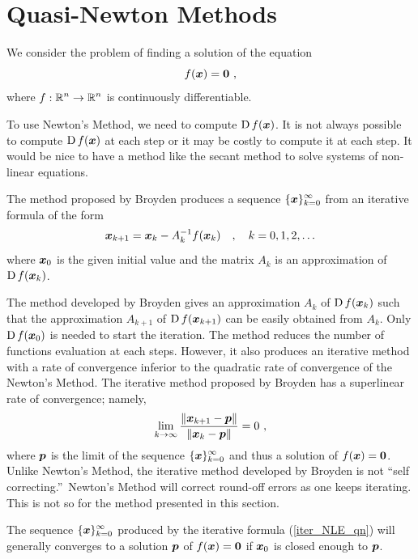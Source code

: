 \section{Quasi-Newton Methods}

We consider the problem of finding a solution of the equation
\begin{equation}
f(\bm{x}) = \bm{0} \ ,
\end{equation}
where $\displaystyle f:\mathbb{R}^n \rightarrow \mathbb{R}^n$ is continuously differentiable.

To use Newton's Method, we need to compute $\operatorname{D} f(\bm{x})$.  It is
not always possible to compute $\operatorname{D} f(\bm{x})$ at each step or it may
be costly to compute it at each step.  It would be nice to have a
method like the secant method to solve systems of non-linear
equations.

The method proposed by Broyden produces a sequence
$\displaystyle \{ \bm{x} \}_{k=0}^\infty$ from an iterative formula of the
form
\begin{equation} \label{iter_NLE_qn}
\bm{x}_{k+1} = \bm{x}_k - A_k^{-1} f(\bm{x}_k) \quad , \quad k=0,1,2,\ldots
\end{equation}
where $\bm{x}_0$ is the given initial value and the matrix $A_k$ is an
approximation of $\operatorname{D} f(\bm{x}_k)$.

The method developed by Broyden gives an approximation $A_k$ of $\operatorname{D}
f(\bm{x}_k)$ such that the approximation $A_{k+1}$ 
of $\operatorname{D} f(\bm{x}_{k+1})$ can be easily obtained from $A_k$.  Only
$\operatorname{D} f(\bm{x}_0)$ is needed to start the iteration.
The method reduces the number of functions evaluation at
each steps.  However, it also produces an iterative method with a rate of
convergence inferior to the quadratic rate of convergence of the Newton's
Method.  The iterative method proposed by Broyden has a superlinear rate of
convergence; namely,
\[
\lim_{k\rightarrow \infty} \frac{\|\bm{x}_{k+1} - \bm{p}\|}
{\|\bm{x}_k - \bm{p}\|} = 0 \ ,
\]
where $\bm{p}$ is the limit of the sequence
$\displaystyle \{ \bm{x} \}_{k=0}^\infty$ and thus a solution of
$f(\bm{x})=\bm{0}$.
Unlike Newton's Method, the iterative method developed by Broyden is not
``self correcting.''\  Newton's Method will correct round-off errors as one
keeps iterating.  This is not so for the method presented in this section.

The sequence $\displaystyle \{ \bm{x} \}_{k=0}^\infty$ produced by the 
iterative formula (\ref{iter_NLE_qn}) will generally converges to a solution
$\bm{p}$ of $f(\bm{x})=\bm{0}$ if $\bm{x}_0$ is closed enough to
$\bm{p}$.

